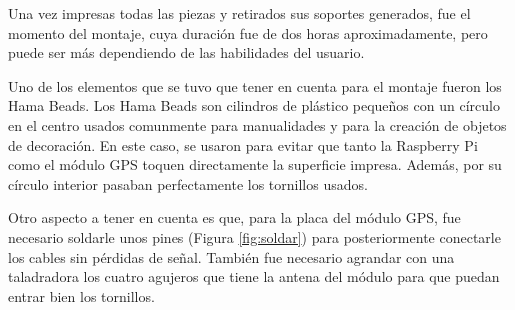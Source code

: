 Una vez impresas todas las piezas y retirados sus soportes generados, fue el momento del montaje, cuya duración fue de dos horas aproximadamente, pero puede ser más dependiendo de las habilidades del usuario.

Uno de los elementos que se tuvo que tener en cuenta para el montaje fueron los Hama Beads. Los Hama Beads son cilindros de plástico pequeños con un círculo en el centro usados comunmente para manualidades y para la creación de objetos de decoración. En este caso, se usaron para evitar que tanto la Raspberry Pi como el módulo GPS toquen directamente la superficie impresa. Además, por su círculo interior pasaban perfectamente los tornillos usados. 



\setcounter{footnote}{80} %


Otro aspecto a tener en cuenta es que, para la placa del módulo GPS, fue necesario soldarle unos pines (Figura \ref{fig:soldar}) para posteriormente conectarle los cables sin pérdidas de señal. También fue necesario agrandar con una taladradora los cuatro agujeros que tiene la antena del módulo para que puedan entrar bien los tornillos. 

